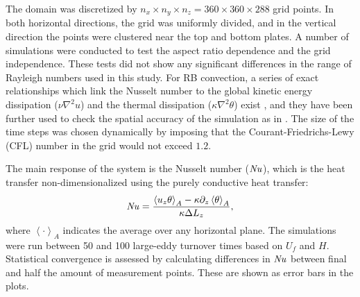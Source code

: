 \documentclass{jfm}
\newcommand\Nus{\mbox{\textit{Nu}}}  %
\begin{document}
The domain was discretized by $n_x \times n_y \times n_z = 360 \times 360
\times 288$ grid points.  In both horizontal directions, the grid was
uniformly divided, and in the vertical direction the points were clustered
near the top and bottom plates.  A number of simulations were conducted to
test the aspect ratio dependence and the grid independence.  These tests did
not show any significant differences in the range of Rayleigh numbers used in
this study.  For RB convection, a series of exact relationships which link the
Nusselt number to the global kinetic energy dissipation ($\nu \nabla^2 u$) and
the thermal dissipation ($\kappa \nabla^2 \theta$) exist \citep{shr90,ahl09},
and they have been further used to check the spatial accuracy of the
simulation as in \cite{ste10}.  The size of the time steps was chosen
dynamically by imposing that the Courant-Friedrichs-Lewy (CFL) number in the
grid would not exceed $1.2$.%

The main response of the system is the Nusselt number ($\Nus$), which is the
heat transfer non-dimensionalized using the purely conductive heat transfer:%
\begin{equation}
    \Nus = \frac{\left< u_z \theta\right>_A - \kappa\partial_z
    \left<\theta\right>_A}{\kappa \Delta L_z}, 
\end{equation}
where $\left<\cdot \right>_A$ indicates the average over any horizontal plane.
The simulations were run between 50 and 100 large-eddy turnover times based on
$U_f$ and $H$. Statistical convergence is assessed by calculating
differences in $\Nus$ between final and half the amount of measurement
points. These are shown as error bars in the plots.
\end{document}

